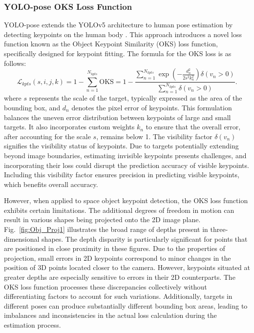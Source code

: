 \documentclass[a4paper,fleqn]{cas-sc}
\begin{document}
\subsubsection{YOLO-pose OKS Loss Function}
YOLO-pose extends the YOLOv5 architecture to human pose estimation by detecting keypoints on the human body \citep{yolo_pose}. This approach introduces a novel loss function known as the Object Keypoint Similarity (OKS) loss function, specifically designed for keypoint fitting. The formula for the OKS loss is as follows:
\begin{equation}
	\mathcal{L}_{kpts}(s, i, j, k) 
    = 1 - \sum_{n=1}^{N_{kpts}} \mathrm{OKS} 
    = 1 - \frac{\sum\limits_{n=1}^{N_{kpts}} \exp \left(-\frac{d_{n}^{2}}{2 s^{2} k_{n}^{2}}\right) \delta\left(v_{n} > 0\right)}{\sum\limits_{n=1}^{N_{kpts}} \delta\left(v_{n} > 0\right)}.
\end{equation}
where $s$ represents the scale of the target, typically expressed as the area of the bounding box, and $d_n$ denotes the pixel error of keypoints. This formulation balances the uneven error distribution between keypoints of large and small targets. It also incorporates custom weights $k_n$ to ensure that the overall error, after accounting for the scale $s$, remains below 1. The visibility factor $\delta(v_n)$ signifies the visibility status of keypoints. Due to targets potentially extending beyond image boundaries, estimating invisible keypoints presents challenges, and incorporating their loss could disrupt the prediction accuracy of visible keypoints. Including this visibility factor ensures precision in predicting visible keypoints, which benefits overall accuracy.

However, when applied to space object keypoint detection, the OKS loss function exhibits certain limitations. The additional degrees of freedom in motion can result in various shapes being projected onto the 2D image plane. Fig.~\ref{fig:Obj_Proj1} illustrates the broad range of depths present in three-dimensional shapes. The depth disparity is particularly significant for points that are positioned in close proximity in these figures. Due to the properties of projection, small errors in 2D keypoints correspond to minor changes in the position of 3D points located closer to the camera. However, keypoints situated at greater depths are especially sensitive to errors in their 2D counterparts. The OKS loss function processes these discrepancies collectively without differentiating factors to account for such variations. Additionally, targets in different poses can produce substantially different bounding box areas, leading to imbalances and inconsistencies in the actual loss calculation during the estimation process.
\end{document}
